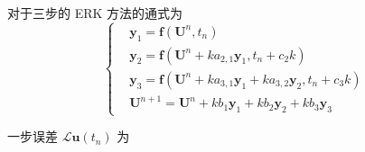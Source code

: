 \documentclass[a4paper]{article}
\begin{document}
\par 对于三步的 ERK 方法的通式为
\begin{equation}
    \left\{
        \begin{aligned}
            &\mathbf{y}_1 = \mathbf{f}(\mathbf{U}^n, t_n)\\
            &\mathbf{y}_2 = \mathbf{f}(\mathbf{U}^n + k a_{2,1} \mathbf{y}_1, t_n + c_2 k)\\
            &\mathbf{y}_3 = \mathbf{f}(\mathbf{U}^n + k a_{3,1} \mathbf{y}_1 + k a_{3,2} \mathbf{y}_2, t_n + c_3 k)\\
            &\mathbf{U}^{n+1} = \mathbf{U}^n + k b_1 \mathbf{y}_1 + k b_2 \mathbf{y}_2 + k b_3 \mathbf{y}_3
        \end{aligned}
    \right.
\end{equation}
\par 一步误差 $\mathcal{L}\mathbf{u}(t_n)$ 为
\end{document}
